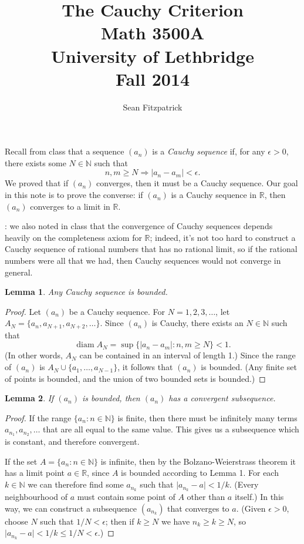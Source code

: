 \documentclass[12pt,letterpaper]{article}
\title{The Cauchy Criterion\\Math 3500A\\University of Lethbridge\\Fall 2014}
\author{Sean Fitzpatrick}
\newtheorem{lemma}{Lemma}
\newcommand{\abs}[1]{\lvert #1\rvert}
\newcommand{\R}{\mathbb{R}}
\newcommand{\N}{\mathbb{N}}
\DeclareMathOperator{\diam}{diam}
\begin{document}
\maketitle

Recall from class that a sequence $(a_n)$ is a {\em Cauchy sequence} if, for any $\epsilon>0$, there exists some $N\in\N$ such that
\[
 n,m\geq N \Rightarrow \abs{a_n-a_m}<\epsilon.
\]
We proved that if $(a_n)$ converges, then it must be a Cauchy sequence. Our goal in this note is to prove the converse: if $(a_n)$ is a Cauchy sequence in $\R$, then $(a_n)$ converges to a limit in $\R$.

: we also noted in class that the convergence of Cauchy sequences depends heavily on the completeness axiom for $\R$; indeed, it's not too hard to construct a Cauchy sequence of rational numbers that has no rational limit, so if the rational numbers were all that we had, then Cauchy sequences would not converge in general.

\begin{lemma}
Any Cauchy sequence is bounded. 
\end{lemma}
\begin{proof}
Let $(a_n)$ be a Cauchy sequence. For $N=1,2,3,\ldots$, let $A_N = \{a_n,a_{N+1},a_{N+2},\ldots\}$. Since $(a_n)$ is Cauchy, there exists an $N\in\N$ such that
\[
 \diam A_N = \sup\{\abs{a_n-a_m} : n,m\geq N\} < 1.
\]
(In other words, $A_N$ can be contained in an interval of length 1.) Since the range of $(a_n)$ is $A_N\cup\{a_1,\ldots, a_{N-1}\}$, it follows that $(a_n)$ is bounded. (Any finite set of points is bounded, and the union of two bounded sets is bounded.)
\end{proof}
\begin{lemma}
 If $(a_n)$ is bounded, then $(a_n)$ has a convergent subsequence.
\end{lemma}
\begin{proof}
If the range $\{a_n:n\in\N\}$ is finite, then there must be infinitely many terms $a_{n_1},a_{n_2},\ldots$ that are all equal to the same value. This gives us a subsequence which is constant, and therefore convergent.

If the set $A=\{a_n : n\in \N\}$ is infinite, then by the Bolzano-Weierstrass theorem it has a limit point $a\in\R$, since $A$ is bounded according to Lemma 1. For each $k\in\N$ we can therefore find some $a_{n_k}$ such that $\abs{a_{n_k}-a}<1/k$. (Every neighbourhood of $a$ must contain some point of $A$ other than $a$ itself.)
In this way, we can construct a subsequence $(a_{n_k})$ that converges to $a$. (Given $\epsilon>0$, choose $N$ such that $1/N<\epsilon$; then if $k\geq N$ we have $n_k\geq k\geq N$, so $\abs{a_{n_k}-a}<1/k \leq 1/N<\epsilon$.)
\end{proof}
\end{document}

